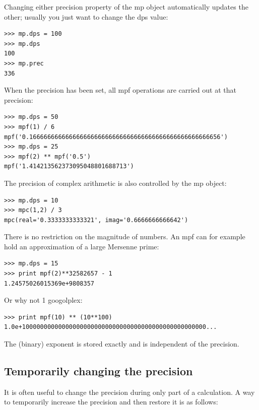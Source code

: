 \vpara
Changing either precision property of the mp object automatically updates the other; usually you just want to change the dps value:

\begin{lstlisting}
>>> mp.dps = 100
>>> mp.dps
100
>>> mp.prec
336
\end{lstlisting}


When the precision has been set, all mpf operations are carried out at that precision:

\begin{lstlisting}
>>> mp.dps = 50
>>> mpf(1) / 6
mpf('0.16666666666666666666666666666666666666666666666666656')
>>> mp.dps = 25
>>> mpf(2) ** mpf('0.5')
mpf('1.414213562373095048801688713')
\end{lstlisting}

The precision of complex arithmetic is also controlled by the mp object:

\begin{lstlisting}
>>> mp.dps = 10
>>> mpc(1,2) / 3
mpc(real='0.3333333333321', imag='0.6666666666642')
\end{lstlisting}


There is no restriction on the magnitude of numbers. An mpf can for example hold an approximation of a large Mersenne prime:

\begin{lstlisting}
>>> mp.dps = 15
>>> print mpf(2)**32582657 - 1
1.24575026015369e+9808357
\end{lstlisting}


Or why not 1 googolplex:

\begin{lstlisting}
>>> print mpf(10) ** (10**100)
1.0e+100000000000000000000000000000000000000000000000000...
\end{lstlisting}


The (binary) exponent is stored exactly and is independent of the precision.


\subsection{Temporarily changing the precision}  

It is often useful to change the precision during only part of a calculation. A way to temporarily increase the precision and then restore it is as follows:

